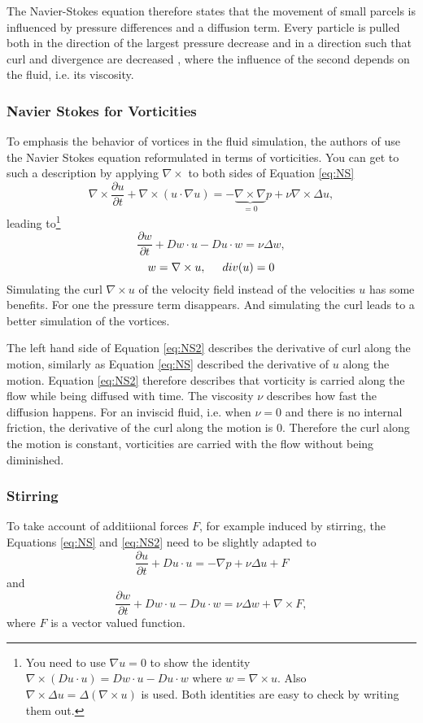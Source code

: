 The Navier-Stokes equation therefore states that the movement of small parcels is influenced by pressure differences and a diffusion term. Every particle is pulled both in the direction of the largest pressure decrease and in a direction such that curl and divergence are decreased , where the influence of the second depends on the fluid, i.e. its viscosity.

\subsubsection{Navier Stokes for Vorticities}
To emphasis the behavior of vortices in the fluid simulation, the authors of  use the Navier Stokes equation reformulated in terms of vorticities. You can get to such a description by applying $\nabla \times$ to both sides of Equation \ref{eq:NS}
\[\nabla \times \frac{\partial u}{ \partial{t}} + \nabla \times (u \cdot \nabla u) = - \underbrace{\nabla\times \nabla}_{=0} p + \nu \nabla \times \Delta u,\]
leading to\footnote{You need to use $\nabla u = 0$ to show the identity $\nabla \times (Du \cdot u) = D w \cdot u - Du \cdot w$ where $w = \nabla \times u$. Also $\nabla \times \Delta u = \Delta (\nabla \times u)$ is used. Both identities are easy to check by writing them out. }
\[\frac{\partial w}{\partial t} + Dw\cdot u - Du \cdot w =  \nu \Delta w,\]
\begin{equation}w = \nabla \times u,\hspace{0.5cm} div(u) = 0\label{eq:NS2}\end{equation}
Simulating the curl $\nabla \times u$ of the velocity field instead of the velocities $u$ has some benefits. For one the pressure term disappears. And simulating the curl leads to a better simulation of the vortices. 

The left hand side of Equation \ref{eq:NS2} describes the derivative of curl along the motion, similarly as Equation \ref{eq:NS} described the derivative of $u$ along the motion. Equation \ref{eq:NS2} therefore describes that  vorticity is carried along the flow while being diffused with time. The viscosity $\nu$ describes how fast the diffusion happens. For an inviscid fluid, i.e. when $\nu = 0$ and there is no internal friction, the derivative of the curl along the motion is 0. Therefore the curl along the motion is constant, vorticities are carried with the flow without being diminished.

\subsubsection{Stirring}
To take account of additiional forces $F$, for example induced by stirring, the Equations \ref{eq:NS} and \ref{eq:NS2} need to be slightly adapted to
\[\frac{\partial u}{\partial t} + Du \cdot u = -\nabla p + \nu \Delta u + F\]
and
\begin{equation}\frac{\partial w}{\partial t} + Dw\cdot u - Du \cdot w =  \nu \Delta w + \nabla \times F \label{eq:NS3},\end{equation}
where $F$ is a vector valued function.

